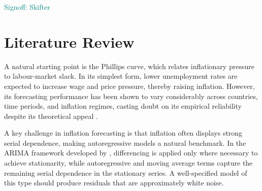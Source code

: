 

\textcolor{teal}{Signoff: Skifter}\newline
\bigskip
\chapter{Literature Review} \label{sec:literature_review}

A natural starting point is the Phillips curve, which relates inflationary pressure to labour-market slack. In its simplest form, lower unemployment rates are expected to increase wage and price pressure, thereby raising inflation. %
However, its forecasting performance has been shown to vary considerably across countries, time periods, and inflation regimes, casting doubt on its empirical reliability despite its theoretical appeal \parencite{stock_watson_2008}.


A key challenge in inflation forecasting is that inflation often displays strong serial dependence, making autoregressive models a natural benchmark. In the ARIMA framework developed by \textcite{box_jenkins_1976}, differencing is applied only where necessary to achieve stationarity, while autoregressive and moving average terms capture the remaining serial dependence in the stationary series. A well-specified model of this type should produce residuals that are approximately white noise.


